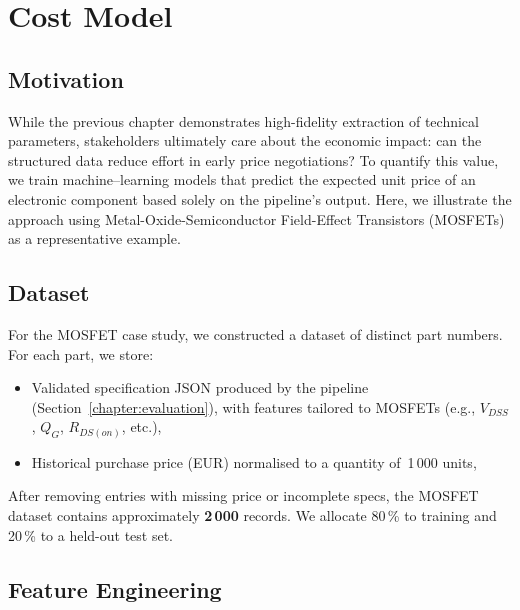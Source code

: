 \section{Cost Model}
\label{chapter:costmodel}

\subsection{Motivation}
While the previous chapter demonstrates high-fidelity extraction of technical parameters, stakeholders ultimately care about the economic impact: can the structured data reduce effort in early price negotiations? To quantify this value, we train machine–learning models that predict the expected unit price of an electronic component based solely on the pipeline's output. Here, we illustrate the approach using Metal-Oxide-Semiconductor Field-Effect Transistors (MOSFETs) as a representative example.

\subsection{Dataset}
For the MOSFET case study, we constructed a dataset of distinct part numbers. For each part, we store:
\begin{itemize}
  \item Validated specification JSON produced by the pipeline (Section~\ref{chapter:evaluation}), with features tailored to MOSFETs (e.g., $V_{DSS}$, $Q_G$, $R_{DS(on)}$, etc.),
  \item Historical purchase price (EUR) normalised to a quantity of~1\,000 units,
\end{itemize}
After removing entries with missing price or incomplete specs, the MOSFET dataset contains approximately \textbf{2\,000} records. We allocate 80\,\% to training and 20\,\% to a held-out test set.

\subsection{Feature Engineering}
